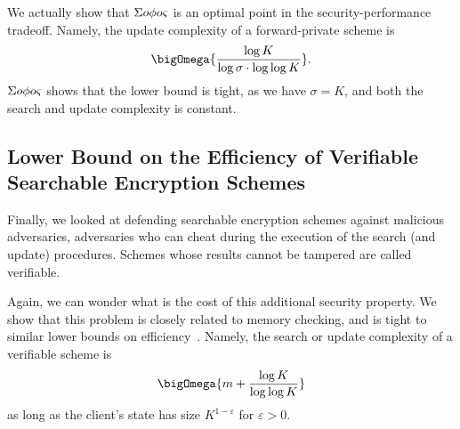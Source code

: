 We actually show that ${\Sigma o\phi o\varsigma}$ is an optimal point in the security-performance tradeoff. Namely, the update complexity of a forward-private scheme is
\[
		\bigOmega{\frac{\log K}{\log \sigma \cdot \log \log  K}}.
\]
${\Sigma o\phi o\varsigma}$ shows that the lower bound is tight, as we have $\sigma = K$, and both the search and update complexity is constant.


\subsection{Lower Bound on the Efficiency of Verifiable Searchable Encryption Schemes} %
\label{sub:vsse_lb}

Finally, we looked at defending searchable encryption schemes against malicious adversaries, \ie adversaries who can cheat during the execution of the search (and update) procedures. 
Schemes whose results cannot be tampered are called verifiable. 

Again, we can wonder what is the cost of this additional security property.
We show that this problem is closely related to  memory checking, and is tight to similar lower bounds on efficiency~\cite{ICALP:TamTri05,TCC:DNRV09}.
Namely, the search or update complexity of a verifiable scheme is \[\bigOmega{m + \frac{\log K}{\log \log K}}\] as long as the client's state has size $K^{1-\varepsilon}$ for $\varepsilon > 0$. 

